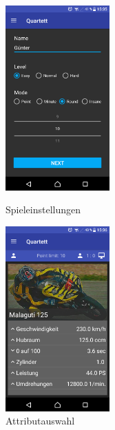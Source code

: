 \documentclass{scrartcl}
\begin{document}
\begin{figure}
  \centering
  \begin{minipage}{0.45\textwidth}
    \centering
    \includegraphics[width=4cm]{img/game_settings.png}
    \caption{Spieleinstellungen}
  \end{minipage}
  \hfill
  \begin{minipage}{0.45\textwidth}
    \centering
    \includegraphics[width=4cm]{img/game_attributes.png}
    \caption{Attributauswahl}
  \end{minipage}
\end{figure}
\end{document}
